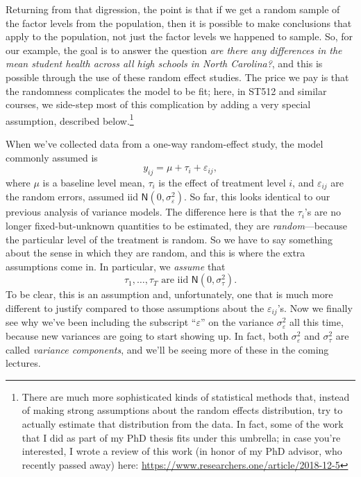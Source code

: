 \documentclass[a4paper, 12pt]{article}
\theoremstyle{plain}
\theoremstyle{definition}
\theoremstyle{remark}
\newcommand{\eps}{\varepsilon}
\newcommand{\nm}{\mathsf{N}}
\begin{document}
Returning from that digression, the point is that if we get a random sample of the factor levels from the population, then it is possible to make conclusions that apply to the population, not just the factor levels we happened to sample.  So, for our example, the goal is to answer the question {\em are there any differences in the mean student health across all high schools in North Carolina?}, and this is possible through the use of these random effect studies.  The price we pay is that the randomness complicates the model to be fit; here, in ST512 and similar courses, we side-step most of this complication by adding a very special assumption, described below.\footnote{There are much more sophisticated kinds of statistical methods that, instead of making strong assumptions about the random effects distribution, try to actually estimate that distribution from the data.  In fact, some of the work that I did as part of my PhD thesis fits under this umbrella; in case you're interested, I wrote a review of this work (in honor of my PhD advisor, who recently passed away) here: \url{https://www.researchers.one/article/2018-12-5}}

When we've collected data from a one-way random-effect study, the model commonly assumed is 
\[ y_{ij} = \mu + \tau_i + \eps_{ij}, \]
where $\mu$ is a baseline level mean, $\tau_i$ is the effect of treatment level $i$, and $\eps_{ij}$ are the random errors, assumed iid $\nm(0,\sigma_\eps^2)$.  So far, this looks identical to our previous analysis of variance models.  The difference here is that the $\tau_i$'s are no longer fixed-but-unknown quantities to be estimated, they are {\em random}---because the particular level of the treatment is random.  So we have to say something about the sense in which they are random, and this is where the extra assumptions come in.  In particular, we {\em assume} that 
\[ \text{$\tau_1,\ldots,\tau_T$ are iid $\nm(0, \sigma_\tau^2)$.} \]
To be clear, this is an assumption and, unfortunately, one that is much more different to justify compared to those assumptions about the $\eps_{ij}$'s.  Now we finally see why we've been including the subscript ``$\eps$'' on the variance $\sigma_\eps^2$ all this time, because new variances are going to start showing up.  In fact, both $\sigma_\eps^2$ and $\sigma_\tau^2$ are called {\em variance components}, and we'll be seeing more of these in the coming lectures.  
\end{document}
